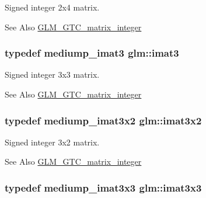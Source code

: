 Signed integer 2x4 matrix. 

\begin{DoxySeeAlso}{See Also}
\hyperlink{group__gtc__matrix__integer}{G\-L\-M\-\_\-\-G\-T\-C\-\_\-matrix\-\_\-integer} 
\end{DoxySeeAlso}
\hypertarget{group__gtc__matrix__integer_ga45481922dd07a3a8e23758286311ee97}{
\subsubsection[{imat3}]{\setlength{\rightskip}{0pt plus 5cm}typedef mediump\-\_\-imat3 {\bf glm\-::imat3}}}\label{group__gtc__matrix__integer_ga45481922dd07a3a8e23758286311ee97}


Signed integer 3x3 matrix. 

\begin{DoxySeeAlso}{See Also}
\hyperlink{group__gtc__matrix__integer}{G\-L\-M\-\_\-\-G\-T\-C\-\_\-matrix\-\_\-integer} 
\end{DoxySeeAlso}
\hypertarget{group__gtc__matrix__integer_ga04deef94cdfdd3b3b2706e10a32ef7f3}{
\subsubsection[{imat3x2}]{\setlength{\rightskip}{0pt plus 5cm}typedef mediump\-\_\-imat3x2 {\bf glm\-::imat3x2}}}\label{group__gtc__matrix__integer_ga04deef94cdfdd3b3b2706e10a32ef7f3}


Signed integer 3x2 matrix. 

\begin{DoxySeeAlso}{See Also}
\hyperlink{group__gtc__matrix__integer}{G\-L\-M\-\_\-\-G\-T\-C\-\_\-matrix\-\_\-integer} 
\end{DoxySeeAlso}
\hypertarget{group__gtc__matrix__integer_gaeff9ef8f56cccc828d6b897923e75402}{
\subsubsection[{imat3x3}]{\setlength{\rightskip}{0pt plus 5cm}typedef mediump\-\_\-imat3x3 {\bf glm\-::imat3x3}}}\label{group__gtc__matrix__integer_gaeff9ef8f56cccc828d6b897923e75402}


